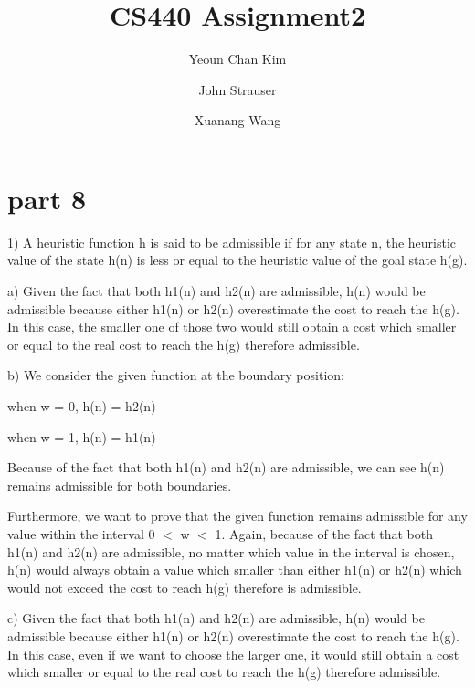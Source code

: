 \documentclass{article}
\author{Yeoun Chan Kim \and John Strauser \and Xuanang Wang}
\title{CS440 Assignment2}
\begin{document}
\maketitle

\section*{part 8}

\hspace{5mm} 

1) A heuristic function h is said to be admissible if for any state n, the heuristic value of the state h{\small (n)} is less or equal to the heuristic value of the goal state h{\small (g)}.

a) Given the fact that both h{\small 1(n)} and h{\small 2(n)} are admissible, h{\small (n)} would be admissible because either h{\small 1(n)} or h{\small 2(n)} overestimate the cost to reach the h{\small (g)}. In this case, the smaller one of those two would still obtain a cost which smaller or equal to the real cost to reach the h{\small (g)} therefore admissible.

b) We consider the given function at the boundary position:
\begin{center}

when w = 0, h{\small(n)} = h{\small 2(n)}

when w = 1, h{\small(n)} = h{\small 1(n)}

\end{center}

Because of the fact that both h{\small 1(n)} and h{\small 2(n)} are admissible, we can see h{\small(n)} remains admissible for both boundaries.

Furthermore, we want to prove that the given function remains admissible for any value within the interval 0 $<$ w $<$ 1. Again, because of the fact that both h{\small 1(n)} and h{\small 2(n)} are admissible, no matter which value in the interval is chosen,  h{\small (n)} would always obtain a value which smaller than either h{\small 1(n)} or h{\small 2(n)} which would not exceed the cost to reach h{\small (g)} therefore is admissible.

c) Given the fact that both h{\small 1(n)} and h{\small 2(n)} are admissible, h{\small (n)} would be admissible because either h{\small 1(n)} or h{\small 2(n)} overestimate the cost to reach the h{\small (g)}. In this case, even if we want to choose the larger one, it would still obtain a cost which smaller or equal to the real cost to reach the h{\small (g)} therefore admissible.
\end{document}
